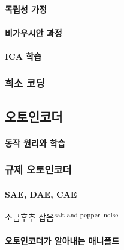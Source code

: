\documentclass [12pt] {oblivoir}
\let\oldsubsubsection=\subsubsection
\renewcommand{\subsubsection}
{
  \filbreak
  \oldsubsubsection
}
\begin{document}
\paragraph*{독립성 가정}\mbox{}

\vspace{3mm}

\paragraph*{비가우시안 과정}\mbox{}

\vspace{3mm}

\paragraph*{ICA 학습}\mbox{}

\vspace{3mm}

\subsubsection{희소 코딩}

\subsection{오토인코더}

\paragraph*{동작 원리와 학습}\mbox{}

\vspace{3mm}

\subsubsection{규제 오토인코더}

\paragraph*{SAE, DAE, CAE}\mbox{}

\vspace{3mm}

소금후추 잡음$^{\text{salt-and-pepper\, noise}}$

\paragraph*{오토인코더가 알아내는 매니폴드}\mbox{}
\end{document}
